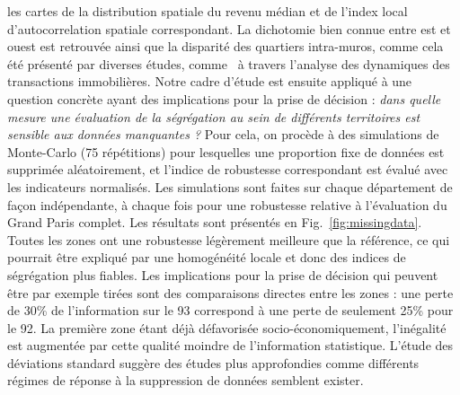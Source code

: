 { les cartes de la distribution spatiale du revenu médian et de l'index local d'autocorrelation spatiale correspondant. La dichotomie bien connue entre est et ouest est retrouvée ainsi que la disparité des quartiers intra-muros, comme cela été présenté par diverses études, comme~\cite{guerois2009dynamique} à travers l'analyse des dynamiques des transactions immobilières. Notre cadre d'étude est ensuite appliqué à une question concrète ayant des implications pour la prise de décision : \textit{dans quelle mesure une évaluation de la ségrégation au sein de différents territoires est sensible aux données manquantes ?} Pour cela, on procède à des simulations de Monte-Carlo (75 répétitions) pour lesquelles une proportion fixe de données est supprimée aléatoirement, et l'indice de robustesse correspondant est évalué avec les indicateurs normalisés. Les simulations sont faites sur chaque département de façon indépendante, à chaque fois pour une robustesse relative à l'évaluation du Grand Paris complet. Les résultats sont présentés en Fig.~\ref{fig:missingdata}. Toutes les zones ont une robustesse légèrement meilleure que la référence, ce qui pourrait être expliqué par une homogénéité locale et donc des indices de ségrégation plus fiables. Les implications pour la prise de décision qui peuvent être par exemple tirées sont des comparaisons directes entre les zones : une perte de 30\% de l'information sur le 93 correspond à une perte de seulement 25\% pour le 92. La première zone étant déjà défavorisée socio-économiquement, l'inégalité est augmentée par cette qualité moindre de l'information statistique. L'étude des déviations standard suggère des études plus approfondies comme différents régimes de réponse à la suppression de données semblent exister.
}



